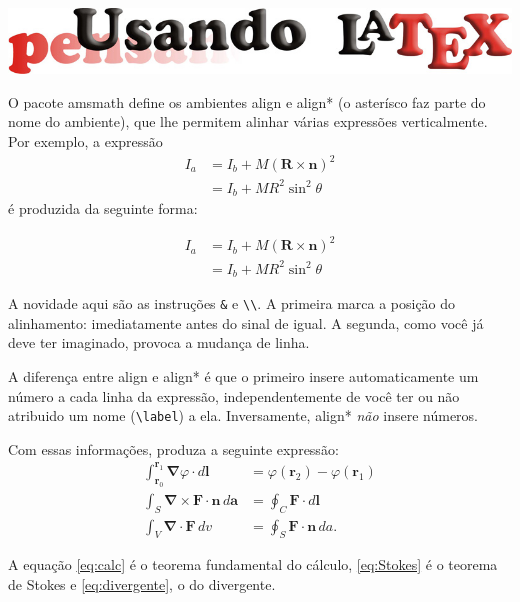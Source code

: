 \documentclass[a4paper,10pt,twocolumn,landscape]{article}
\newcommand{\pkg}[1]{{\normalfont\sffamily\color{orange}#1}}
\newcommand{\env}[1]{{\normalfont\sffamily\color{green!50!black}#1}}
\newcommand\vetor[1]{\mathbf{#1}}
\begin{document}
\begin{center}\includegraphics[width=0.8\columnwidth]{../figuras/LogotipoCursoLaTeX_v2}\end{center}

	O pacote \pkg{amsmath} define os ambientes \env{align} e \env{align*} (o asterísco faz parte do nome do ambiente), que lhe permitem alinhar várias expressões verticalmente. Por exemplo, a expressão
	\begin{align*}
	I_a &= I_b + M \left(\mathbf{R} \times \mathbf{n}\right)^2\\
		 &= I_b + M R^2 \sin^2\theta
	\end{align*}
é produzida da seguinte forma:
	\begin{LaTeXcode}
\begin{align*}
I_a &= I_b + M \left(\mathbf{R} \times \mathbf{n}\right)^2 \\
    &= I_b + M R^2 \sin^2\theta
\end{align*}
	\end{LaTeXcode}

	A novidade aqui são as instruções \verb|&| e \verb|\\|. A primeira marca a posição do alinhamento: imediatamente antes do sinal de igual. A segunda, como você já deve ter imaginado, provoca a mudança de linha.

	A diferença entre \env{align} e \env{align*} é que o primeiro insere automaticamente um número a cada linha da expressão, independentemente de você ter ou não atribuido um nome (\verb|\label|) a ela. Inversamente, \env{align*} \emph{não} insere números.

	Com essas informações, produza a seguinte expressão:
	\begin{align}
		\int_{\vetor r_0}^{\vetor r_1} \vetor\nabla \varphi \cdot d\vetor l 
				&= \varphi(\vetor{r}_2) - \varphi(\vetor{r}_1)\label{eq:calc} \\
		\int_S \vetor\nabla \times \vetor F \cdot \vetor n\, d\vetor a
				&= \oint_C \vetor F \cdot d\vetor l\label{eq:Stokes} \\
		\int_V \vetor\nabla \cdot \vetor F \, dv
				&= \oint_S \vetor F \cdot \vetor n\, da.\label{eq:divergente}
	\end{align}

	A equação \ref{eq:calc} é o teorema fundamental do cálculo, \eqref{eq:Stokes} é o teorema de Stokes e \eqref{eq:divergente}, o do divergente.
\end{document}
